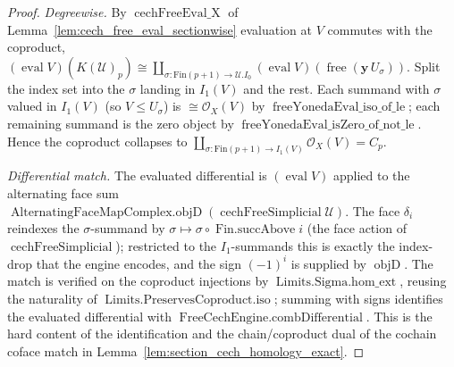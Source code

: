 \begin{proof}
  \emph{Degreewise.} By \(\operatorname{cechFreeEval\_X}\) of
  Lemma~\ref{lem:cech_free_eval_sectionwise} evaluation at \(V\) commutes with the
  coproduct,
  \((\operatorname{eval} V)(K(\mathcal{U})_p) \cong \coprod_{\sigma :
  \mathrm{Fin}(p+1) \to \mathcal{U}.I_0} (\operatorname{eval} V)(\operatorname{free}
  (\mathbf{y}\,U_\sigma))\). Split the index set into the \(\sigma\) landing in
  \(I_1(V)\) and the rest. Each summand with \(\sigma\) valued in \(I_1(V)\) (so
  \(V \leq U_\sigma\)) is \(\cong \mathcal{O}_X(V)\) by
  \(\operatorname{freeYonedaEval\_iso\_of\_le}\); each remaining summand is the zero
  object by \(\operatorname{freeYonedaEval\_isZero\_of\_not\_le}\). Hence the coproduct
  collapses to \(\coprod_{\sigma : \mathrm{Fin}(p+1) \to I_1(V)} \mathcal{O}_X(V) =
  C_p\).

  \emph{Differential match.} The evaluated differential is \((\operatorname{eval} V)\)
  applied to the alternating face sum
  \(\operatorname{AlternatingFaceMapComplex.objD}(\operatorname{cechFreeSimplicial}
  \mathcal{U})\). The face \(\delta_i\) reindexes the \(\sigma\)-summand by
  \(\sigma \mapsto \sigma \circ \operatorname{Fin.succAbove} i\) (the face action of
  \(\operatorname{cechFreeSimplicial}\)); restricted to the
  \(I_1\)-summands this is exactly the index-drop that the engine encodes, and the sign
  \((-1)^i\) is supplied by \(\operatorname{objD}\). The match is verified on the
  coproduct injections by \(\operatorname{Limits.Sigma.hom\_ext}\), reusing the
  naturality of \(\operatorname{Limits.PreservesCoproduct.iso}\); summing with signs
  identifies the evaluated differential with
  \(\operatorname{FreeCechEngine.combDifferential}\). This is the hard content of the
  identification and the chain/coproduct dual of the cochain coface match in
  Lemma~\ref{lem:section_cech_homology_exact}.


\end{proof}
